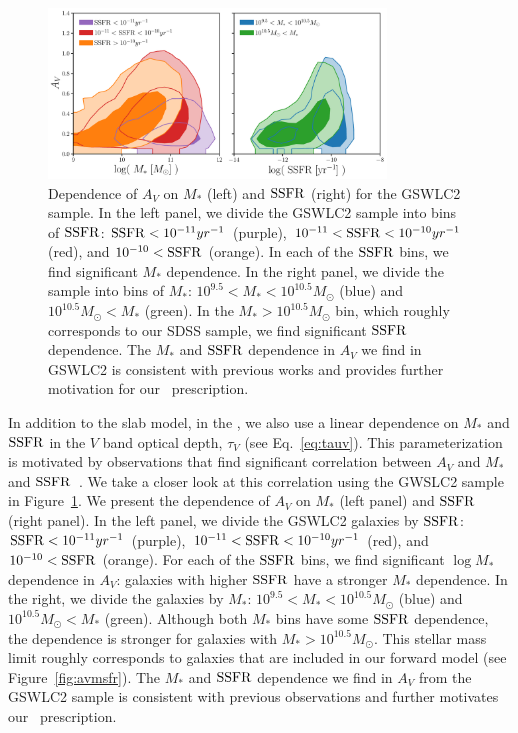 \begin{figure}
\begin{center}
    \includegraphics[width=0.8\textwidth]{figs/gswlc_dep.pdf}
    \caption{\label{fig:dep}
    Dependence of $A_V$ on $M_*$ (left) and ${\rm SSFR}$ (right) for the
    \cite{salim2018} GSWLC2 sample.
    In the left panel, we divide the GSWLC2 sample into bins of ${\rm SSFR}$: 
    ${\rm SSFR} < 10^{-11}yr^{-1}$ (purple), 
    $10^{-11} < {\rm SSFR} < 10^{-10}yr^{-1}$ (red),
    and  $10^{-10} < {\rm SSFR}$ (orange). 
    In each of the ${\rm SSFR}$ bins, we find significant $M_*$ dependence. 
    In the right panel, we divide the sample into bins of $M_*$:  
    $10^{9.5} < M_* < 10^{10.5}M_\odot$ (blue) and $10^{10.5} M_\odot < M_*$ (green).
    In the $M_* > 10^{10.5}M_\odot$ bin, which roughly corresponds to our
    SDSS sample, we find significant ${\rm SSFR}$ dependence.
    The $M_*$ and ${\rm SSFR}$ dependence in $A_V$ we find in GSWLC2 is
    consistent with previous works and provides further motivation for our
    \eda~prescription.
    }
\end{center}
\end{figure}

In addition to the slab model, in the \eda, we also use a linear
dependence on $M_*$ and ${\rm SSFR}$ in the $V$ band optical depth,
$\tau_V$ (see Eq.~\ref{eq:tauv}).
This parameterization is motivated by observations that find significant
correlation between $A_V$ and $M_*$ and ${\rm SSFR}$~\citep[\eg~][]{garn2010, battisti2016, salim2020}. 
We take a closer look at this correlation using the GWSLC2 sample in
Figure~\ref{fig:dep}.
We present the dependence of $A_V$ on $M_*$ (left panel) and ${\rm SSFR}$ (right
panel). 
In the left panel, we divide the GSWLC2 galaxies by ${\rm SSFR}$: 
${\rm SSFR} < 10^{-11}yr^{-1}$ (purple), $10^{-11} < {\rm SSFR} < 10^{-10}yr^{-1}$
(red), and  $10^{-10} < {\rm SSFR}$ (orange). 
For each of the ${\rm SSFR}$ bins, we find significant $\log M_*$ dependence in
$A_V$: galaxies with higher ${\rm SSFR}$ have a stronger $M_*$ dependence.  
In the right, we divide the galaxies by $M_*$: 
$10^{9.5} < M_* < 10^{10.5}M_\odot$ (blue) and $10^{10.5} M_\odot < M_*$
(green).
Although both $M_*$ bins have some ${\rm SSFR}$ dependence, the dependence is
stronger for galaxies with $M_* > 10^{10.5}M_\odot$. 
This stellar mass limit roughly corresponds to galaxies that are included
in our forward model (see Figure~\ref{fig:avmsfr}). 
The $M_*$ and ${\rm SSFR}$ dependence we find in $A_V$ from the GSWLC2 sample is
consistent with previous observations and further motivates our
\eda~prescription.

